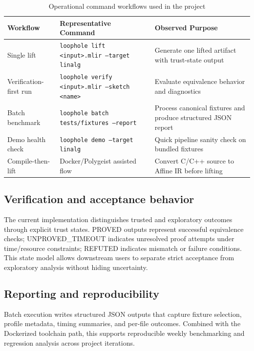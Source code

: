 \begin{table}[H]
\centering
\caption{Operational command workflows used in the project}
\begin{tabular}{|p{3.0cm}|p{5.0cm}|p{7.2cm}|}
\hline
\textbf{Workflow} & \textbf{Representative Command} & \textbf{Observed Purpose} \\
\hline
Single lift & \texttt{loophole lift <input>.mlir --target linalg} & Generate one lifted artifact with trust-state output \\
\hline
Verification-first run & \texttt{loophole verify <input>.mlir --sketch <name>} & Evaluate equivalence behavior and diagnostics \\
\hline
Batch benchmark & \texttt{loophole batch tests/fixtures --report} & Process canonical fixtures and produce structured JSON report \\
\hline
Demo health check & \texttt{loophole demo --target linalg} & Quick pipeline sanity check on bundled fixtures \\
\hline
Compile-then-lift & Docker/Polygeist assisted flow & Convert C/C++ source to Affine IR before lifting \\
\hline
\end{tabular}
\end{table}

\subsection*{Verification and acceptance behavior}
The current implementation distinguishes trusted and exploratory outcomes through explicit trust states. PROVED outputs represent successful equivalence checks; UNPROVED\_TIMEOUT indicates unresolved proof attempts under time/resource constraints; REFUTED indicates mismatch or failure conditions. This state model allows downstream users to separate strict acceptance from exploratory analysis without hiding uncertainty.

\subsection*{Reporting and reproducibility}
Batch execution writes structured JSON outputs that capture fixture selection, profile metadata, timing summaries, and per-file outcomes. Combined with the Dockerized toolchain path, this supports reproducible weekly benchmarking and regression analysis across project iterations.
